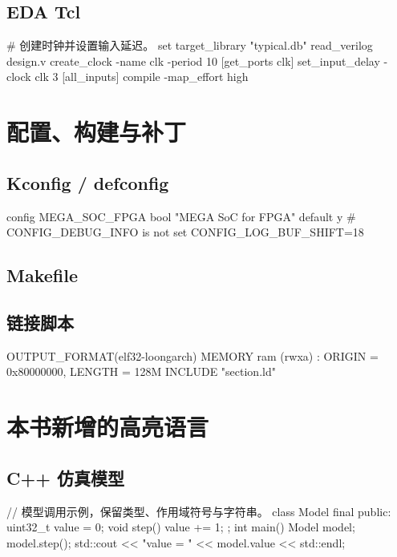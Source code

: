 \documentclass[10pt,letterpaper]{book}
\begin{document}
\subsection*{EDA Tcl}
\begin{CodeBlock}[language=BookTcl]
# 创建时钟并设置输入延迟。
set target_library "typical.db"
read_verilog design.v
create_clock -name clk -period 10 [get_ports clk]
set_input_delay -clock clk 3 [all_inputs]
compile -map_effort high
\end{CodeBlock}

\clearpage
\section*{配置、构建与补丁}
\subsection*{Kconfig / defconfig}
\begin{CodeBlock}[language=BookConfig]
config MEGA_SOC_FPGA
    bool "MEGA SoC for FPGA"
    default y
# CONFIG_DEBUG_INFO is not set
CONFIG_LOG_BUF_SHIFT=18
\end{CodeBlock}

\subsection*{Makefile}

\subsection*{链接脚本}
\begin{CodeBlock}[language=BookLinker]
OUTPUT_FORMAT(elf32-loongarch)
MEMORY {
  ram (rwxa) : ORIGIN = 0x80000000, LENGTH = 128M
}
INCLUDE "section.ld"
\end{CodeBlock}

\clearpage
\section*{本书新增的高亮语言}
\subsection*{C++ 仿真模型}
\begin{CodeBlock}[language=BookCpp]
// 模型调用示例，保留类型、作用域符号与字符串。
class Model final {
public:
  uint32_t value = 0;
  void step() { value += 1; }
};
int main() {
  Model model;
  model.step();
  std::cout << "value = " << model.value << std::endl;
}
\end{CodeBlock}
\end{document}
